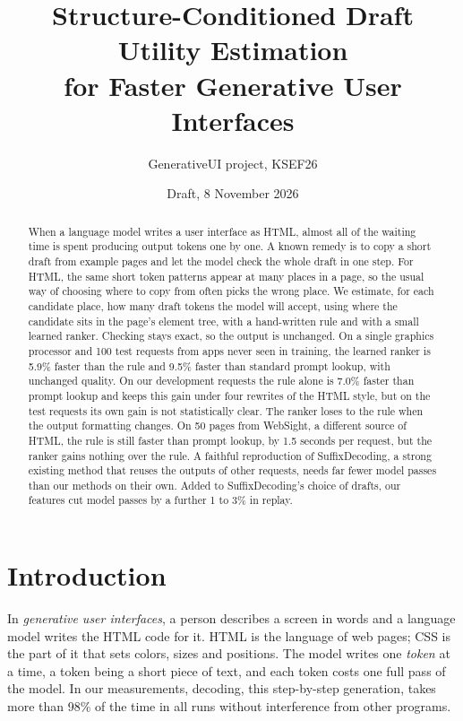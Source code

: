 \documentclass[10pt,a4paper]{article}
\title{\textbf{Structure-Conditioned Draft Utility Estimation\\for Faster Generative User Interfaces}}
\author{GenerativeUI project, KSEF26}
\date{Draft, 8 November 2026}
\begin{document}
\maketitle

\begin{abstract}
\noindent When a language model writes a user interface as HTML, almost all of the waiting time is spent producing output tokens one by one. A known remedy is to copy a short draft from example pages and let the model check the whole draft in one step. For HTML, the same short token patterns appear at many places in a page, so the usual way of choosing where to copy from often picks the wrong place. We estimate, for each candidate place, how many draft tokens the model will accept, using where the candidate sits in the page's element tree, with a hand-written rule and with a small learned ranker. Checking stays exact, so the output is unchanged. On a single graphics processor and 100 test requests from apps never seen in training, the learned ranker is 5.9\% faster than the rule and 9.5\% faster than standard prompt lookup, with unchanged quality. On our development requests the rule alone is 7.0\% faster than prompt lookup and keeps this gain under four rewrites of the HTML style, but on the test requests its own gain is not statistically clear. The ranker loses to the rule when the output formatting changes. On 50 pages from WebSight, a different source of HTML, the rule is still faster than prompt lookup, by 1.5 seconds per request, but the ranker gains nothing over the rule. A faithful reproduction of SuffixDecoding, a strong existing method that reuses the outputs of other requests, needs far fewer model passes than our methods on their own. Added to SuffixDecoding's choice of drafts, our features cut model passes by a further 1 to 3\% in replay.
\end{abstract}

\section{Introduction}
In \emph{generative user interfaces}, a person describes a screen in words and a language model writes the HTML code for it. HTML is the language of web pages; CSS is the part of it that sets colors, sizes and positions. The model writes one \emph{token} at a time, a token being a short piece of text, and each token costs one full pass of the model. In our measurements, decoding, this step-by-step generation, takes more than 98\% of the time in all runs without interference from other programs.
\end{document}
